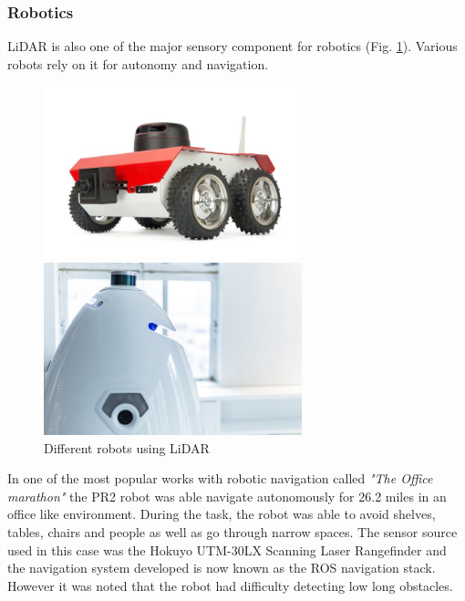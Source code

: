 \subsubsection*{Robotics}
\ac{LiDAR} is also one of the major sensory component for robotics (Fig. \ref{fig:robotslidar}). Various robots rely on it for autonomy and navigation.
\begin{figure}[h] 
    \begin{minipage}[b]{.49\linewidth}
        \includegraphics[height=5cm,width=\linewidth]{imgs/chapter2/robot1.jpg}
    \end{minipage}
    \begin{minipage}[b]{.49\linewidth}
        \includegraphics[height=5cm,width=\linewidth]{imgs/chapter2/robot2.jpg}
    \end{minipage}
    \caption{Different robots using \ac{LiDAR}}
    \label{fig:robotslidar}
\end{figure}


In one of the most popular works with robotic navigation called \textit{"The Office marathon"} \cite{marder2010office}  the PR2 robot was able navigate autonomously for 26.2 miles in an office like environment. During the task, the robot was able to avoid  shelves, tables, chairs and people as well as go
through narrow spaces. The sensor source used in this case was the Hokuyo UTM-30LX Scanning Laser Rangefinder and the navigation system developed is now known as the \ac{ROS} navigation stack. However it was noted that the robot had difficulty detecting low long obstacles.


